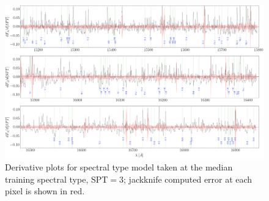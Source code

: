 \documentclass[twocolumn]{aastex62}
\begin{document}
\begin{figure}[]
	\begin{center}
	\includegraphics[width=16cm]{derivative_jackknife_spt.png}
	\end{center}
	\caption{Derivative plots for spectral type model taken at the median training spectral type, SPT$=3$; jackknife computed error at each pixel is shown in red.} 
	\label{fig:west_derivative}
\end{figure}


\end{document}
